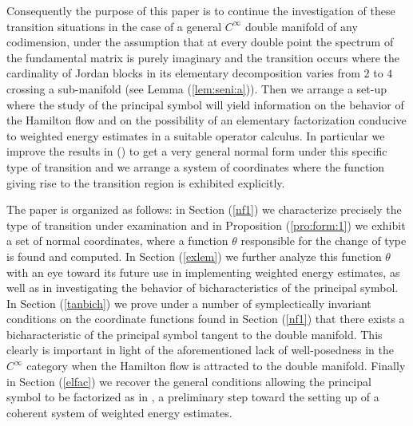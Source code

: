 \documentclass[12pt,leqno]{article} %
\numberwithin{equation}{section}
\begin{document}
Consequently the purpose of this paper is to continue the investigation of these
transition situations in the case of a general $ C^{\infty} $ double
manifold of any codimension, under the assumption that at every double point the spectrum of
the fundamental matrix is purely imaginary and the transition occurs
where the cardinality of Jordan
blocks in its elementary decomposition varies from $ 2 $ to $ 4 $
crossing a sub-manifold (see Lemma (\ref{lem:seni:a})). Then we  arrange a set-up where the study of
the principal symbol
will yield information on the behavior of the Hamilton flow and on the
possibility of an elementary factorization conducive to weighted
energy estimates in a suitable operator calculus. In particular we improve the
results in  (\cite{MR2942985}) to get a very general normal form under
this specific type of transition and we arrange a system of coordinates
where the function giving rise to the transition region is exhibited
explicitly.

The paper is organized as follows: in Section (\ref{nf1}) we characterize precisely the type of transition under examination
and in Proposition (\ref{pro:form:1}) we exhibit a set of normal
coordinates, where a function $ \theta $ responsible for the change of
type is found and computed. In Section (\ref{exlem}) we
further analyze this function $ \theta $ with an eye toward its future
use in implementing weighted energy estimates, as well as in investigating the behavior of bicharacteristics of the principal symbol.
In Section (\ref{tanbich}) we prove under a number of symplectically invariant
conditions on the coordinate functions found in Section (\ref{nf1})
that there exists a bicharacteristic of the principal symbol tangent
to the double manifold. This clearly is important in light of the
aforementioned lack of well-posedness in the $ C^{\infty} $ category
when the Hamilton flow is attracted to the double manifold.
Finally in Section (\ref{elfac}) we recover
the general conditions allowing the principal symbol to be factorized
as in \cite{zbMATH03625907}, a preliminary step toward the setting up
of a coherent system of weighted energy estimates.













\end{document}
